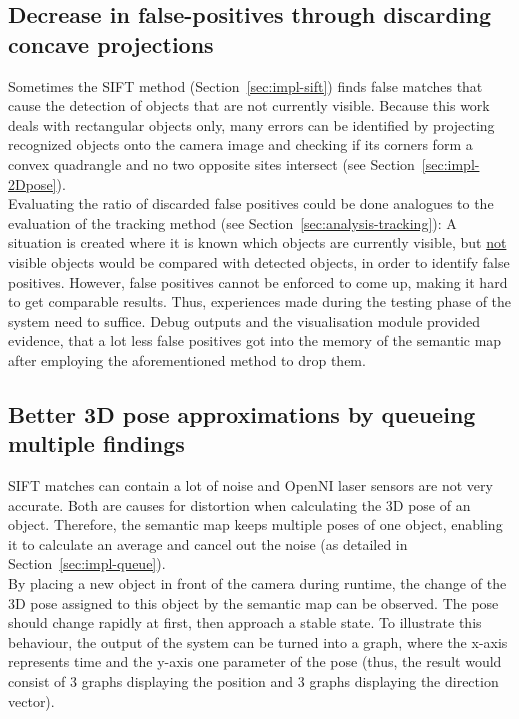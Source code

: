 \subsection{Decrease in false-positives through discarding concave projections}
Sometimes the SIFT method (Section~\ref{sec:impl-sift}) finds false matches that cause the detection of objects that are not currently visible. Because this work deals with rectangular objects only, many errors can be identified by projecting recognized objects onto the camera image and checking if its corners form a convex quadrangle and no two opposite sites intersect (see Section~\ref{sec:impl-2Dpose}). \\

Evaluating the ratio of discarded false positives could be done analogues to the evaluation of the tracking method (see Section~\ref{sec:analysis-tracking}): A situation is created where it is known which objects are currently visible, but \underline{not} visible objects would be compared with detected objects, in order to identify false positives. However, false positives cannot be enforced to come up, making it hard to get comparable results. Thus, experiences made during the testing phase of the system need to suffice. Debug outputs and the visualisation module provided evidence, that a lot less false positives got into the memory of the semantic map after employing the aforementioned method to drop them.


\subsection{Better 3D pose approximations by queueing multiple findings}
\label{sec:analysis-poses}
SIFT matches can contain a lot of noise and OpenNI laser sensors are not very accurate. Both are causes for distortion when calculating the 3D pose of an object. Therefore, the semantic map keeps multiple poses of one object, enabling it to calculate an average and cancel out the noise (as detailed in Section~\ref{sec:impl-queue}). \\

By placing a new object in front of the camera during runtime, the change of the 3D pose assigned to this object by the semantic map can be observed. The pose should change rapidly at first, then approach a stable state. To illustrate this behaviour, the output of the system can be turned into a graph, where the x-axis represents time and the y-axis one parameter of the pose (thus, the result would consist of 3 graphs displaying the position and 3 graphs displaying the direction vector).

